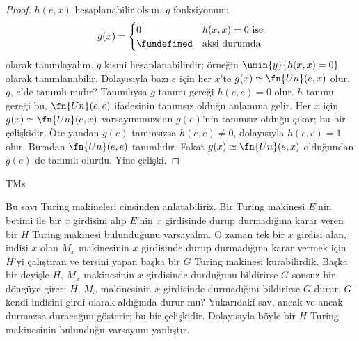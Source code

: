 \begin{proof}
$h(e,x)$ hesaplanabilir olsun. $g$ fonksiyonunu
\[
  g(x)=\begin{cases}
    0 & \text{$h(x,x)=0$ ise}\\
    \fundefined & \text{aksi durumda}
  \end{cases}
\]
olarak tanımlayalım. $g$ kısmi hesaplanabilirdir; örneğin
$\umin{y}{h(x,x)=0}$ olarak tanımlanabilir. Dolayısıyla bazı $e$ için her
$x$'te $g(x)\simeq\fn{Un}(e,x)$ olur. $g$, $e$'de tanımlı mıdır? Tanımlıysa
$g$ tanımı gereği $h(e,e)=0$ olur. $h$ tanımı gereği bu,
$\fn{Un}(e,e)$ ifadesinin tanımsız olduğu anlamına gelir. Her $x$ için
$g(x)\simeq\fn{Un}(e,x)$ varsayımımızdan $g(e)$'nin tanımsız olduğu çıkar;
bu bir çelişkidir. Öte yandan $g(e)$ tanımsızsa $h(e,e)\neq0$, dolayısıyla
$h(e,e)=1$ olur. Buradan $\fn{Un}(e,e)$ tanımlıdır. Fakat
$g(x)\simeq\fn{Un}(e,x)$ olduğundan $g(e)$ de tanımlı olurdu. Yine çelişki.
\end{proof}

\begin{tagblock}{TMs}
\begin{explain}
Bu savı Turing makineleri cinsinden anlatabiliriz. Bir Turing makinesi $E$'nin
betimi ile bir $x$ girdisini alıp $E$'nin $x$ girdisinde durup durmadığına
karar veren bir $H$ Turing makinesi bulunduğunu varsayalım. O zaman tek bir
$x$ girdisi alan, indisi $x$ olan $M_x$ makinesinin $x$ girdisinde durup
durmadığına karar vermek için $H$'yi çalıştıran ve tersini yapan başka bir
$G$ Turing makinesi kurabilirdik. Başka bir deyişle $H$, $M_x$ makinesinin
$x$ girdisinde durduğunu bildirirse $G$ sonsuz bir döngüye girer; $H$,
$M_x$ makinesinin $x$ girdisinde durmadığını bildirirse $G$ durur. $G$ kendi
indisini girdi olarak aldığında durur mu? Yukarıdaki sav, ancak ve ancak
durmazsa duracağını gösterir; bu bir çelişkidir. Dolayısıyla böyle bir
$H$ Turing makinesinin bulunduğu varsayımı yanlıştır.
\end{explain}
\end{tagblock}

